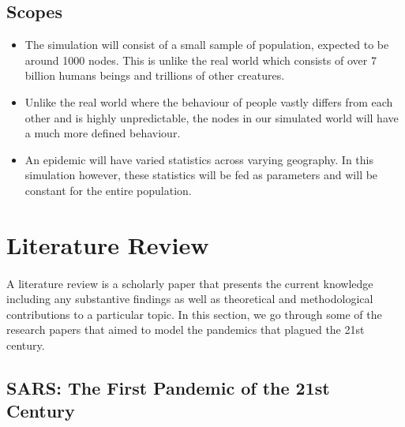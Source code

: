 \documentclass[14pt, a4paper]{extarticle}
\begin{document}
	    \subsection{Scopes}
    	    \begin{itemize}
    	        \item The simulation will consist of a small sample of population, expected to be around 1000 nodes. This is unlike the real world which consists of over 7 billion humans beings and trillions of other creatures.
    	        
    	        \item Unlike the real world where the behaviour of people vastly differs from each other and is highly unpredictable, the nodes in our simulated world will have a much more defined behaviour.
    	        
    	        \item An epidemic will have varied statistics across varying geography. In this simulation however, these statistics will be fed as parameters and will be constant for the entire population.
    	    \end{itemize}
	
	\newpage
	\section{Literature Review}
	    \paragraph{} A literature review is a scholarly paper that presents the current knowledge including any substantive findings as well as theoretical and methodological contributions to a particular topic. In this section, we go through some of the research papers that aimed to model the pandemics that plagued the 21st century.
	       
	   \subsection{SARS: The First Pandemic of the 21st Century}
\end{document}
